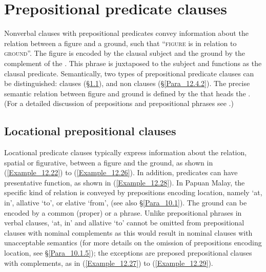 \section{Prepositional predicate clauses}
\label{Para_12.4}
Nonverbal clauses with prepositional predicates convey information about the relation between a figure and a ground, such that ``\textsc{figure} is in relation to \textsc{ground}''. The figure is encoded by the clausal subject and the ground by the complement of the . This phrase is juxtaposed to the subject and functions as the clausal predicate. Semantically, two types of prepositional predicate clauses can be distinguished:  clauses (§\ref{Para_12.4.1}), and non clauses (§\ref{Para_12.4.2}). The precise semantic relation between figure and ground is defined by the  that heads the . (For a detailed discussion of prepositions and prepositional phrases see .)


\subsection{Locational prepositional clauses}
\label{Para_12.4.1}
Locational predicate clauses typically express information about the  relation, spatial or figurative, between a figure and the ground, as shown in (\ref{Example_12.22}) to (\ref{Example_12.26}). In addition,  predicates can have presentative function, as shown in (\ref{Example_12.28}). In Papuan Malay, the specific kind of relation is conveyed by prepositions encoding location, namely   ‘at, in’, allative  ‘to’, or elative  ‘from’, (see also §\ref{Para_10.1}). The ground can be encoded by a common (proper)  or a  phrase. Unlike prepositional phrases in verbal clauses,   ‘at, in’ and allative  ‘to’ cannot be omitted from prepositional clauses with nominal complements as this would result in nominal clauses with unacceptable semantics (for more details on the omission of prepositions encoding location, see §\ref{Para_10.1.5}); the exceptions are preposed prepositional clauses with  complements, as in (\ref{Example_12.27}) to (\ref{Example_12.29}).



